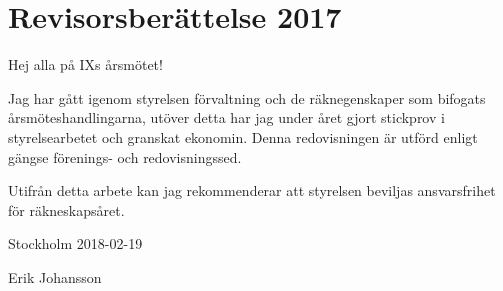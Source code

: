 \documentclass[a4paper,11pt,oneside]{article}
\begin{document}
\section{Revisorsberättelse 2017}

Hej alla på IXs årsmötet!

Jag har gått igenom styrelsen förvaltning och de räknegenskaper som bifogats
årsmöteshandlingarna, utöver detta har jag under året gjort stickprov i
styrelsearbetet och granskat ekonomin. Denna redovisningen är utförd enligt
gängse förenings- och redovisningssed.

Utifrån detta arbete kan jag rekommenderar att styrelsen beviljas
ansvarsfrihet för räkneskapsåret.

Stockholm 2018-02-19

Erik Johansson
\end{document}
